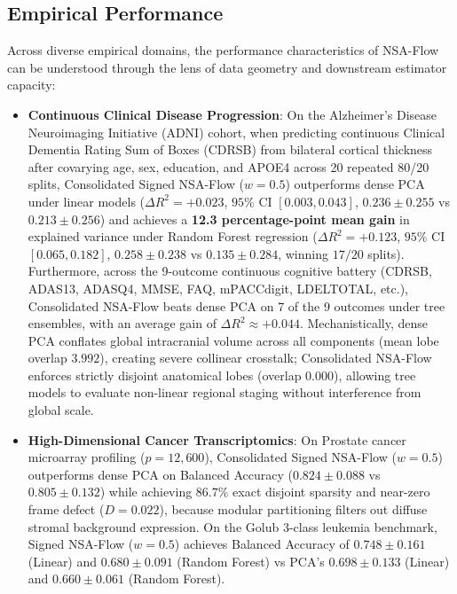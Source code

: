 \documentclass[
]{article}
\providecommand{\tightlist}{%
  \setlength{\itemsep}{0pt}\setlength{\parskip}{0pt}}
\begin{document}
\subsection{Empirical Performance}\label{empirical-performance}

Across diverse empirical domains, the performance characteristics of NSA-Flow can be understood through the lens of data geometry and downstream estimator capacity:

\begin{itemize}
\tightlist
\item
  \textbf{Continuous Clinical Disease Progression}: On the Alzheimer's Disease Neuroimaging Initiative (ADNI) cohort, when predicting continuous Clinical Dementia Rating Sum of Boxes (CDRSB) from bilateral cortical thickness after covarying age, sex, education, and APOE4 across 20 repeated 80/20 splits, Consolidated Signed NSA-Flow (\(w=0.5\)) outperforms dense PCA under linear models (\(\Delta R^2 = +0.023\), \(95\%\) CI \([0.003, 0.043]\), \(0.236 \pm 0.255\) vs \(0.213 \pm 0.256\)) and achieves a \textbf{12.3 percentage-point mean gain} in explained variance under Random Forest regression (\(\Delta R^2 = +0.123\), \(95\%\) CI \([0.065, 0.182]\), \(0.258 \pm 0.238\) vs \(0.135 \pm 0.284\), winning \(17/20\) splits). Furthermore, across the 9-outcome continuous cognitive battery (CDRSB, ADAS13, ADASQ4, MMSE, FAQ, mPACCdigit, LDELTOTAL, etc.), Consolidated NSA-Flow beats dense PCA on 7 of the 9 outcomes under tree ensembles, with an average gain of \(\Delta R^2 \approx +0.044\). Mechanistically, dense PCA conflates global intracranial volume across all components (mean lobe overlap \(3.992\)), creating severe collinear crosstalk; Consolidated NSA-Flow enforces strictly disjoint anatomical lobes (overlap \(0.000\)), allowing tree models to evaluate non-linear regional staging without interference from global scale.
\item
  \textbf{High-Dimensional Cancer Transcriptomics}: On Prostate cancer microarray profiling (\(p=12,600\)), Consolidated Signed NSA-Flow (\(w=0.5\)) outperforms dense PCA on Balanced Accuracy (\(0.824 \pm 0.088\) vs \(0.805 \pm 0.132\)) while achieving \(86.7\%\) exact disjoint sparsity and near-zero frame defect (\(D=0.022\)), because modular partitioning filters out diffuse stromal background expression. On the Golub 3-class leukemia benchmark, Signed NSA-Flow (\(w=0.5\)) achieves Balanced Accuracy of \(0.748 \pm 0.161\) (Linear) and \(0.680 \pm 0.091\) (Random Forest) vs PCA's \(0.698 \pm 0.133\) (Linear) and \(0.660 \pm 0.061\) (Random Forest).

\end{itemize}
\end{document}
